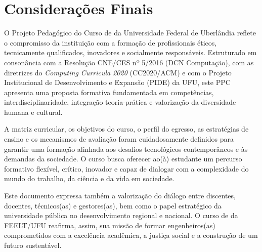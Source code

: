 \chapter{Considerações Finais}

O Projeto Pedagógico do Curso de \nomecursonovo da Universidade Federal de Uberlândia reflete o compromisso da instituição com a formação de profissionais éticos, tecnicamente qualificados, inovadores e socialmente responsáveis. Estruturado em consonância com a Resolução CNE/CES nº 5/2016 (DCN Computação), com as diretrizes do \textit{Computing Curricula 2020} (CC2020/ACM) e com o Projeto Institucional de Desenvolvimento e Expansão (PIDE) da UFU, este PPC apresenta uma proposta formativa fundamentada em competências, interdisciplinaridade, integração teoria-prática e valorização da diversidade humana e cultural.

A matriz curricular, os objetivos do curso, o perfil do egresso, as estratégias de ensino e os mecanismos de avaliação foram cuidadosamente definidos para garantir uma formação alinhada aos desafios tecnológicos contemporâneos e às demandas da sociedade. O curso busca oferecer ao(à) estudante um percurso formativo flexível, crítico, inovador e capaz de dialogar com a complexidade do mundo do trabalho, da ciência e da vida em sociedade.

Este documento expressa também a valorização do diálogo entre discentes, docentes, técnicos(as) e gestores(as), bem como o papel estratégico da universidade pública no desenvolvimento regional e nacional. O curso de \nomecursonovo da FEELT/UFU reafirma, assim, sua missão de formar engenheiros(as) comprometidos com a excelência acadêmica, a justiça social e a construção de um futuro sustentável.
